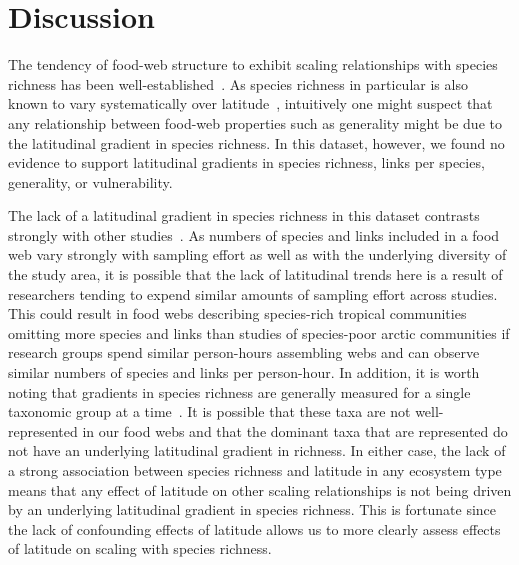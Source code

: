\documentclass[12pt]{article}
\begin{document}
\section*{Discussion}

  The tendency of food-web structure to exhibit scaling relationships with
  species richness has been well-established~\cite{Dunne2004,Riede2010}. As
  species richness in particular is also known to vary systematically over
  latitude~\cite{Kaufman1995,Macpherson2002,Hillebrand2004,Schemske2009},
  intuitively one might suspect that any relationship between food-web
  properties such as generality might be due to the latitudinal gradient in
  species richness. In this dataset, however, we found no evidence to support
  latitudinal gradients in species richness, links per species, generality, or
  vulnerability.


  The lack of a latitudinal gradient in species richness in this dataset
  contrasts strongly with other
  studies~\cite{Kaufman1995,Macpherson2002,Hillebrand2004,Schemske2009}. As
  numbers of species and links included in a food web vary strongly with
  sampling effort as well as with the underlying diversity of the study area,
  it is possible that the lack of latitudinal trends here is a result of
  researchers tending to expend similar amounts of sampling effort across
  studies. This could result in food webs describing species-rich tropical
  communities omitting more species and links than studies of species-poor
  arctic communities if research groups spend similar person-hours assembling
  webs and can observe similar numbers of species and links per person-hour.
  In addition, it is worth noting that gradients in species richness are
  generally measured for a single taxonomic group at a
  time~\cite{Kaufman1995,Macpherson2002,Hillebrand2004,Schemske2009}. It is
  possible that these taxa are not well-represented in our food webs and that
  the dominant taxa that are represented do not have an underlying latitudinal
  gradient in richness. In either case, the lack of a strong association
  between species richness and latitude in any ecosystem type means that any
  effect of latitude on other scaling relationships is not being driven by an
  underlying latitudinal gradient in species richness. This is fortunate since
  the lack of confounding effects of latitude allows us to more clearly assess
  effects of latitude on scaling with species richness.
\end{document}
